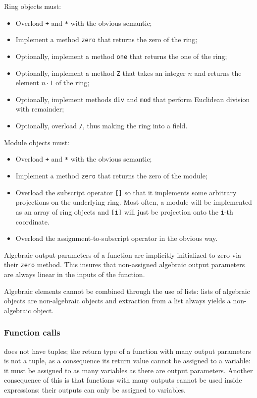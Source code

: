 Ring objects must:
\begin{itemize}
\item Overload \lstinline-+- and \lstinline+*+ with the obvious semantic;
\item Implement a method \lstinline-zero- that returns the zero of the ring;
\item Optionally, implement a method \lstinline-one- that returns the
  one of the ring;
\item Optionally, implement a method \lstinline-Z- that takes an
  integer $n$ and returns the element $n\cdot 1$ of the ring;
\item Optionally, implement methods \lstinline+div+ and
  \lstinline+mod+ that perform Euclidean division with remainder;
\item Optionally, overload \lstinline+/+, thus making the ring into a
  field.
\end{itemize}

Module objects must:
\begin{itemize}
\item Overload \lstinline-+- and \lstinline+*+ with the obvious semantic;
\item Implement a method \lstinline-zero- that returns the zero of the
  module;
\item Overload the subscript operator \lstinline+[]+ so that it
  implements some arbitrary projections on the underlying ring. Most
  often, a module will be implemented as an array of ring objects and
  \lstinline+[i]+ will just be projection onto the \lstinline+i+-th
  coordinate.
\item Overload the assignment-to-subscript operator in the obvious
  way.
\end{itemize}

Algebraic output parameters of a function are implicitly initialized
to zero via their \lstinline+zero+ method. This insures that
non-assigned algebraic output parameters are always linear in the
inputs of the function.

Algebraic elements cannot be combined through the use of lists: lists
of algebraic objects are non-algebraic objects and extraction from a
list always yields a non-algebraic object.


\subsubsection{Function calls}
\tALpy{} does not have tuples; the return type of a function with many
output parameters is not a tuple, as a consequence its return value
cannot be assigned to a variable: it must be assigned to as many
variables as there are output parameters.  Another consequence of this
is that functions with many outputs cannot be used inside expressions:
their outputs can only be assigned to variables.

